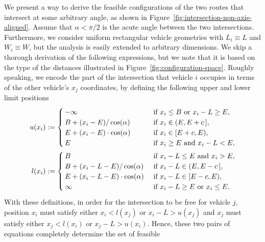 \documentclass[a4paper]{report}
\theoremstyle{definition}
\theoremstyle{plain}
\newcommand\halfopen[2]{\ensuremath{[#1,#2)}}
\newcommand\openhalf[2]{\ensuremath{(#1,#2]}}
\begin{document}
We present a way to derive the feasible configurations of the two routes that
intersect at some arbitrary angle, as shown in Figure~\ref{fig:intersection-non-axis-aligned}.
Assume that $\alpha < \pi / 2$ is the acute angle between the two intersections.
%
Furthermore, we consider uniform rectangular vehicle geometries with
$L_{i} \equiv L$ and $W_{i} \equiv W$, but the analysis is easily extended to
arbitrary dimensions.
%
We skip a thorough derivation of the following expressions, but we note that it
is based on the type of the distances illustrated in
Figure~\ref{fig:configuration-space}.
%
Roughly speaking, we encode the part of the intersection that vehicle $i$
occupies in terms of the other vehicle's $x_{j}$ coordinates, by defining the
following upper and lower limit positions
\begin{align}
  u(x_{i}) &:=
  \begin{cases}
    -\infty & \hspace{1.9em} \text{ if } x_{i} \leq B \text{ or } x_{i} - L \geq E , \\
    B + (x_{i} - E) / \cos(\alpha) & \hspace{1.9em} \text{ if } x_{i} \in \openhalf{E}{E + c\,} , \\
    E + (x_{i} - E) \cdot \cos(\alpha) & \hspace{1.9em} \text{ if } x_{i} \in \halfopen{E + c}{E} , \\
    E & \hspace{1.9em} \text{ if } x_{i} \geq E \text{ and } x_{i} - L < E ,
  \end{cases} \\
  l(x_{i}) &:=
  \begin{cases}
    B & \text{ if } x_{i} - L \leq E \text{ and } x_{i} > E , \\
    B + (x_{i} - L - E) / \cos(\alpha)     & \text{ if } x_{i} - L \in \openhalf{E}{E - c\,} , \\
    E + (x_{i} - L - E) \cdot \cos(\alpha) & \text{ if } x_{i} - L \in \halfopen{E - c}{E} , \\
    \infty & \text{ if } x_{i} - L \geq E \text{ or } x_{i} \leq E .
  \end{cases}
\end{align}
With these definitions, in order for the intersection to be free for vehicle
$j$, position $x_{i}$ must satisfy either $x_{i} < l(x_{j})$ or
$x_{i} - L > u(x_{j})$ and $x_{j}$ must satisfy either $x_{j} < l(x_{i})$ or
$x_{j} - L > u(x_{i})$.
%
Hence, these two pairs of equations completely determine the set of feasible
\end{document}
